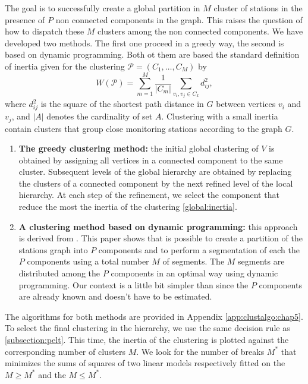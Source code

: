 The goal is to successfully create a global partition in $M$ cluster of stations in the presence of $P$ non connected components in the graph. This raises the question of how to dispatch these $M$ clusters among the non connected components. We have developed two methods. The first one proceed in a greedy way, the second is based on dynamic programming. Both ot them are based the standard definition of inertia given for the clustering $\mathcal{P}=(C_1,\ldots, C_M)$ by
\begin{equation}\label{global:inertia}
    W(\mathcal{P}) = \sum_{m=1}^M \frac{1}{|C_m|}\sum_{v_i, v_j \in C_k}d^2_{ij},
\end{equation} 
where $d^2_{ij}$ is the square of the shortest path distance in $G$ between vertices $v_i$ and $v_j$, and $|A|$ denotes the cardinality of set $A$. Clustering with a small inertia contain clusters that group close monitoring stations according to the graph $G$.
\begin{enumerate}
    \item \textbf{The greedy clustering method:} the initial global clustering of $V$ is obtained by assigning all vertices in a connected component to the same cluster. Subsequent levels of the global hierarchy are obtained by replacing the clusters of a connected component by the next refined level of the local hierarchy. At each step of the refinement, we select the component that reduce the most the inertia of the clustering \ref{global:inertia}.
    \item \textbf{A clustering method based on dynamic programming:} this approach is derived from \cite{hebrail2010exploratory}. This paper shows that is possible to create a partition of the stations graph into $P$ components and to perform a segmentation of each the $P$ components using a total number $M$ of segments. The $M$ segments are distributed among the $P$ components in an optimal way using dynamic programming. Our context is a little bit simpler than \cite{hebrail2010exploratory} since the $P$ components are already known and doesn't have to be estimated. 
\end{enumerate}
The algorithms for both methods are provided in Appendix \ref{app:clustalgo:chap5}. To select the final clustering in the hierarchy, we use the same decision rule as \ref{subsection:pelt}. This time, the inertia of the clustering is plotted against the corresponding number of clusters $M$. We look for the number of breaks $M^*$ that minimizes the sums of squares of two linear models respectively fitted on the $M \geq M^*$ and the $M \leq M^*$.      

